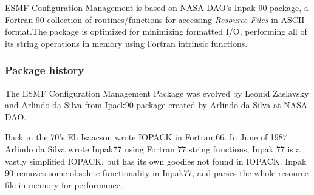 
\label{sec:Config}

ESMF Configuration Management is based on NASA DAO's 
Inpak 90 package, a Fortran 90 collection of routines/functions
for accessing {\em Resource Files} in ASCII format.The package 
is optimized for minimizing formatted I/O, performing all of its 
string operations in memory using Fortran intrinsic functions.\\

\subsubsection{Package history}

The ESMF Configuration Management Package was evolved by
Leonid Zaslavsky and Arlindo da Silva from Ipack90 package
created by Arlindo da Silva at NASA DAO.

Back in the 70's Eli Isaacson wrote IOPACK in Fortran
66.  In June of 1987 Arlindo da Silva wrote Inpak77 using
Fortran 77 string functions; Inpak 77 is a vastly
simplified IOPACK, but has its own goodies not found in
IOPACK.  Inpak 90 removes some obsolete functionality in
Inpak77, and parses the whole resource file in memory for
performance.

